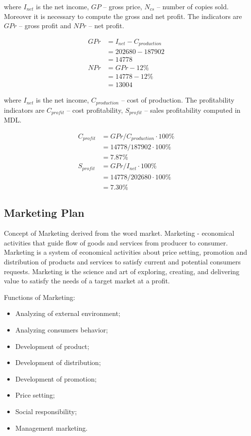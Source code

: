 \noindent
where $I_{net}$ is the net income, $GP$ -- gross price, $N_{cs}$ -- number of copies sold. Moreover it is necessary to compute the gross and net profit. The indicators are $GPr$ -- gross profit and $NPr$ -- net profit.

\begin{equation}
 \begin{split}
  GPr &= I_{net} - C_{production}\\
              &= 202680 - 187902\\
              &= 14778\\
  NPr &= GPr - 12\% \\
             &= 14778 - 12\% \\
             &= 13004
 \end{split}
\end{equation}

\noindent
where $I_{net}$ is the net income, $C_{production}$ -- cost of production. The profitability indicators are $C_{profit}$ -- cost profitability, $S_{profit}$ -- sales profitability computed in MDL.

\begin{equation}
 \begin{split}
  C_{profit} &= GPr / C_{production} \cdot 100\%\\
              &= 14778 / 187902 \cdot 100\% \\
              &= 7.87 \%\\
  S_{profit} &= GPr / I_{net} \cdot 100\% \\
             &= 14778 / 202680 \cdot 100\% \\
             &= 7.30 \%
 \end{split}
\end{equation}

\subsection{Marketing Plan}
Concept of Marketing derived from the word market. Marketing - economical activities that guide flow of goods and services from producer to consumer.  Marketing is a system of economical activities about price setting, promotion and distribution of products and services to satisfy current and potential consumers requests. Marketing is the science and art of exploring, creating, and delivering value to satisfy the needs of a target market at a profit.

 Functions of Marketing:
 \begin{itemize}
 \item Analyzing of external environment;
 \item Analyzing consumers behavior;
 \item Development of product;
 \item Development of distribution;
 \item Development of promotion;
 \item Price setting;
 \item Social responsibility;
 \item Management marketing.
\end{itemize}

